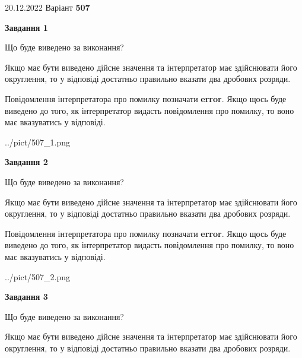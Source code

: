 \documentclass[12pt, ukrainian]{article}
\begin{document}
{20.12.2022 Варіант \No \textbf { 507 }\par}
{
\begin {Large}

{\begin {center}\textbf{Завдання 1}\end {center}}\par
Що буде виведено за виконання? \par

Якщо має бути виведено дійсне значення та інтерпретатор має здійснювати його округлення, 
то у відповіді достатньо правильно вказати два дробових розряди.

Повідомлення інтерпретатора про помилку позначати \textbf{error}.
Якщо щось буде виведено до того, як інтерпретатор видасть повідомлення про помилку, 
то воно має вказуватись у відповіді. \par

\begin{center}
	{../pict/507_1.png}
\end{center}
\newpage

{\begin {center}\textbf{Завдання 2}\end {center}}\par
Що буде виведено за виконання? \par

Якщо має бути виведено дійсне значення та інтерпретатор має здійснювати його округлення, 
то у відповіді достатньо правильно вказати два дробових розряди.

Повідомлення інтерпретатора про помилку позначати \textbf{error}.
Якщо щось буде виведено до того, як інтерпретатор видасть повідомлення про помилку, 
то воно має вказуватись у відповіді. \par

\begin{center}
	{../pict/507_2.png}
\end{center}
\newpage

{\begin {center}\textbf{Завдання 3}\end {center}}\par
Що буде виведено за виконання? \par

Якщо має бути виведено дійсне значення та інтерпретатор має здійснювати його округлення, 
то у відповіді достатньо правильно вказати два дробових розряди.


\end{Large}}
\end{document}
